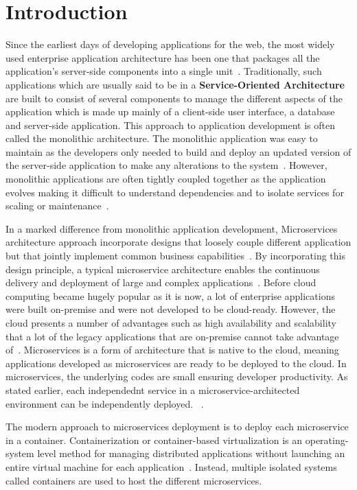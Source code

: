 \section{Introduction}

Since the earliest days of developing applications for the web, the
most widely used enterprise application architecture has been one that
packages all the application's server-side components into a single
unit~\cite{hid-sp18-501-infoq}. Traditionally, such applications which
are usually said to be in a {\bf Service-Oriented Architecture} are built
to consist of several components to manage the different aspects of
the application which is made up mainly of a client-side user
interface, a database and server-side application. This approach to
application development is often called the monolithic
architecture. The monolithic application was easy to maintain as the
developers only needed to build and deploy an updated version of the
server-side application to make any alterations to the
system~\cite{hid-sp18-501-mulesoft}. However, monolithic applications
are often tightly coupled together as the application evolves making
it difficult to understand dependencies and to isolate services for
scaling or maintenance~\cite{hid-sp18-501-trello}.
 
In a marked difference from monolithic application development,
Microservices architecture approach incorporate designs
that loosely couple different application but that jointly implement
common business capabilities~\cite{hid-sp18-501-microservicesio}. 
By incorporating this design principle, a typical microservice
architecture enables the continuous delivery and deployment of large and
complex applications~\cite{hid-sp18-501-researchgate}. 
Before cloud computing became hugely popular as it
is now, a lot of enterprise applications were built on-premise and
were not developed to be cloud-ready. However, the cloud presents a
number of advantages such as high availability and scalability that a
lot of the legacy applications that are on-premise cannot take
advantage of~\cite{hid-sp18-501-springer}. Microservices is a form of
architecture that is native to the cloud, meaning applications
developed as microservices are ready to be deployed to the cloud. In
microservices, the underlying codes are small ensuring developer
productivity. As stated earlier, each independednt service in a 
microservice-architected environment can be independently deployed.
~\cite{hid-sp18-501-infoq}.

The modern approach to microservices deployment is to deploy each
microservice in a container. Containerization or container-based
virtualization is an operating-system level method for managing 
distributed applications without launching an entire virtual
machine for each application~\cite{hid-sp18-501-techtarget}. Instead,
multiple isolated systems called containers are used to host the
different microservices.

